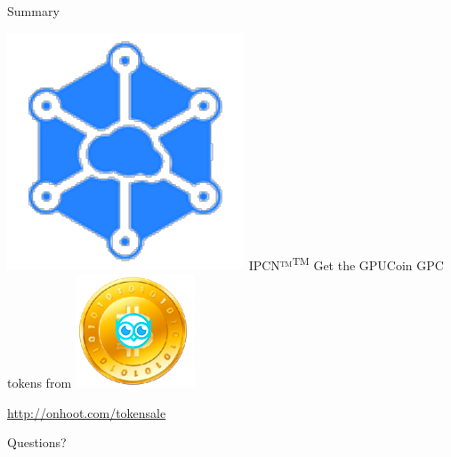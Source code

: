 \documentclass[10pt,handout]{beamer}
\begin{document}
\begin{frame}{Summary}

\includegraphics[scale=.4]{static/ipcn-p2p}
IPCN™\textsuperscript{TM} Get the GPUCoin GPC tokens from
\includegraphics[scale=0.4]{static/hootcoin} 
 \begin{center}\url{http://onhoot.com/tokensale}\end{center}




 \begin{center}\ccbysa\end{center}

\end{frame}
{%

\begin{frame}[standout]
 Questions?
\end{frame}
}%
\end{document}
